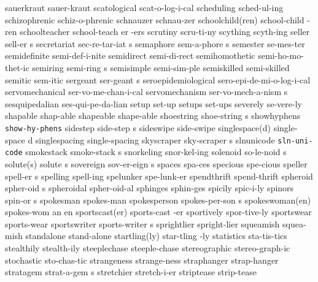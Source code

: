 \1 sauerkraut		sauer-kraut
\1 scatological		scat-o-log-i-cal
\1 scheduling		sched-ul-ing
\1 schizophrenic	schiz-o-phrenic
\1 schnauzer		schnau-zer
\2 schoolchild(ren)	school-child -ren
\6 schoolteacher	school-teach er -ers
\1 scrutiny		scru-ti-ny		%
\1 scything		scyth-ing
\5 seller		sell-er s		%
\5 secretariat		sec-re-tar-iat s
\5 semaphore		sem-a-phore s
\1 semester		se-mes-ter
\1 semidefinite 	semi-def-i-nite
\1 semidirect		semi-di-rect		%
\1 semihomothetic	semi-ho-mo-thet-ic
\5 semiring		semi-ring s
\1 semisimple		semi-sim-ple		%
\1 semiskilled		semi-skilled
\1 semitic		sem-itic		%
\5 sergeant		ser-geant s		%
\1 seroepidemiological	sero-epi-de-mi-o-log-i-cal
\1 servomechanical	ser-vo-me-chan-i-cal	%
\5 servomechanism	ser-vo-mech-a-nism s
\1 sesquipedalian	ses-qui-pe-da-lian	%
\1 setup		set-up
\1 setups		set-ups
\1 severely		se-vere-ly
\NewWordtrue
\1 shapable		shap-able		%
\1 shapeable		shape-able
\5 shoestring		shoe-string s
\1 showhyphens		{\tt\bs show-hy-phens}	%
\5 sidestep		side-step s
\1 sideswipe		side-swipe
\NewWordtrue
\2 singlespace(d)	single-space d		%
\NewWordtrue
\1 singlespacing	single-spacing		%
\5 skyscraper		sky-scraper s
\NewWordtrue
\1 slnunicode		{\tt sln-uni-code}	%
\5 smokestack		smoke-stack s
\1 snorkeling		snor-kel-ing
\5 solenoid		so-le-noid s
\2 solute(s)		solute s
\5 sovereign		sov-er-eign s
\1 spaces		spa-ces
\1 specious		spe-cious
\5 speller		spell-er s		%
\1 spelling		spell-ing		%
\1 spelunker		spe-lunk-er
\1 spendthrift		spend-thrift
\5 spheroid		spher-oid s
\1 spheroidal		spher-oid-al
\1 sphinges		sphin-ges
\1 spicily		spic-i-ly
\5 spinors		spin-or s
\NewWordtrue
\1 spokesman		spokes-man		%
\NewWordtrue
\5 spokesperson		spokes-per-son s	%
\3 spokeswoman(en)	spokes-wom an en
\2 sportscast(er)	sports-cast -er
\1 sportively		spor-tive-ly
\1 sportswear		sports-wear
\5 sportswriter		sports-writer s
\1 sprightlier		spright-lier
\1 squeamish		squea-mish
\1 standalone		stand-alone
\2 startling(ly)	star-tling -ly
\1 statistics		sta-tis-tics
\1 stealthily		stealth-ily
\1 steeplechase		steeple-chase
\1 stereographic	stereo-graph-ic		%
\1 stochastic		sto-chas-tic
\1 strangeness		strange-ness
\1 straphanger		strap-hanger		%
\5 stratagem		strat-a-gem s
\1 stretchier		stretch-i-er
\1 striptease		strip-tease		%
